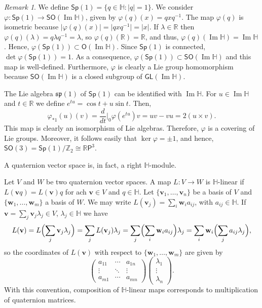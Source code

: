 \documentclass[12pt, a4paper]{amsart}
\newcommand{\g}{\mathfrak}
\newcommand{\R}{\mathbb{R}}
\renewcommand{\H}{\mathbb{H}}
\renewcommand{\Im}{\operatorname{Im}}
\theoremstyle{remark}
\newtheorem*{remark}{Remark}
\begin{document}
\begin{remark}
We define $\mathsf{Sp}(1)=\{q\in\H:\lvert q\rvert =1\}$.
We consider $\varphi\colon\mathsf{Sp}(1)\to\mathsf{SO}(\Im\H)$, given by $\varphi(q)(x)=qxq^{-1}$. 
The map $\varphi(q)$ is isometric because $\lvert\varphi(q)(x)\rvert=\lvert qxq^{-1}\rvert=\lvert x\rvert$. 
If $\lambda\in\R$ then $\varphi(q)(\lambda)=q\lambda q^{-1}=\lambda$, so $\varphi(q)(\R)=\R$, and thus, $\varphi(q)(\Im\H)=\Im\H$. 
Hence, $\varphi(\mathsf{Sp}(1))\subset\mathsf{O}(\Im\H)$.
Since $\mathsf{Sp}(1)$ is connected, $\det\varphi(\mathsf{Sp}(1))=1$. 
As a consequence, $\varphi(\mathsf{Sp}(1))\subset\mathsf{SO}(\Im\H)$ and this map is well-defined.
Furthermore, $\varphi$ is clearly a Lie group homomorphism because $\mathsf{SO}(\Im\H)$ is a closed subgroup of $\mathsf{GL}(\Im\H)$. 

The Lie algebra $\g{sp}(1)$ of $\mathsf{Sp}(1)$ can be identified with $\Im\H$.
For $u\in\Im\H$ and $t\in\R$ we define $e^{tu}=\cos t+u\sin t$.
Then, 
\[
\varphi_{*1}(u)(v)=\frac{d}{dt}\bigg\vert_0\varphi(e^{tu})v=uv-vu=2(u\times v).
\]
This map is clearly an isomorphism of Lie algebras. 
Therefore, $\varphi$ is a covering of Lie groups.
Moreover, it follows easily that $\ker\varphi={\pm 1}$, and hence, $\mathsf{SO}(3)=\mathsf{Sp}(1)/\mathbb{Z}_2\cong\R\mathsf{P}^3$.
\end{remark}



A quaternion vector space is, in fact, a right $\H$-module.

Let $V$ and $W$ be two quaternion vector spaces. 
A map $L\colon V\to W$ is $\H$-linear if $L(\mathbf{v}q)=L(\mathbf{v})q$ for ach $\mathbf{v}\in V$ and $q\in\H$. Let $\{\mathbf{v}_1,\dots,\mathbf{v}_n\}$ be a basis of $V$ and $\{\mathbf{w}_1,\dots,\mathbf{w}_m\}$ a basis of $W$. 
We may write $L(\mathbf{v}_j)=\sum_i \mathbf{w}_i a_{ij}$, with $a_{ij}\in\H$. 
If $\mathbf{v}=\sum_j \mathbf{v}_j\lambda_j\in V$, $\lambda_j\in\H$ we have 
\[
L(\mathbf{v})
=L\Bigl(\sum_j \mathbf{v}_j\lambda_j\Bigr)
=\sum_j L(\mathbf{v}_j)\lambda_j{}=\sum_j\Bigl(\sum_i \mathbf{w}_i a_{ij}\Bigr)\lambda_j
=\sum_{i}\mathbf{w}_i\Bigl(\sum_j a_{ij}\lambda_j\Bigr),
\]
so the coordinates of $L(\mathbf{v})$ with respect to $\{\mathbf{w}_1,\dots,\mathbf{w}_m\}$ are given by
\[
\begin{pmatrix}
a_{11} & \cdots & a_{1n}\\
\vdots & \ddots & \vdots\\
a_{m1} & \cdots & a_{mn}
\end{pmatrix}
\begin{pmatrix}
\lambda_1\\
\vdots\\
\lambda_n
\end{pmatrix}.
\]
With this convention, composition of $\H$-linear maps corresponds to multiplication of quaternion matrices.
\end{document}
